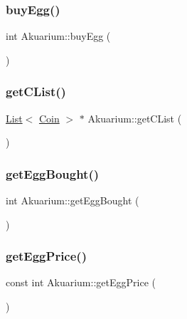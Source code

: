 \mbox{\label{class_akuarium_ab68614c24c06e011b93cc5d03103f352}} 
\subsubsection{\texorpdfstring{buy\+Egg()}{buyEgg()}}
{\footnotesize\ttfamily int Akuarium\+::buy\+Egg (\begin{DoxyParamCaption}{ }\end{DoxyParamCaption})}

\mbox{\label{class_akuarium_a8eebf8e6e312dee21e4d790de5e6f614}} 
\subsubsection{\texorpdfstring{get\+C\+List()}{getCList()}}
{\footnotesize\ttfamily \mbox{\hyperlink{class_list}{List}}$<$ \mbox{\hyperlink{class_coin}{Coin}} $>$ $\ast$ Akuarium\+::get\+C\+List (\begin{DoxyParamCaption}{ }\end{DoxyParamCaption})}

\mbox{\label{class_akuarium_ad5c60aa9ac76b1af2de9ed50765ef9cf}} 
\subsubsection{\texorpdfstring{get\+Egg\+Bought()}{getEggBought()}}
{\footnotesize\ttfamily int Akuarium\+::get\+Egg\+Bought (\begin{DoxyParamCaption}{ }\end{DoxyParamCaption})}

\mbox{\label{class_akuarium_a45b387e510e5a938017908a63d22283c}} 
\subsubsection{\texorpdfstring{get\+Egg\+Price()}{getEggPrice()}}
{\footnotesize\ttfamily const int Akuarium\+::get\+Egg\+Price (\begin{DoxyParamCaption}{ }\end{DoxyParamCaption})}

